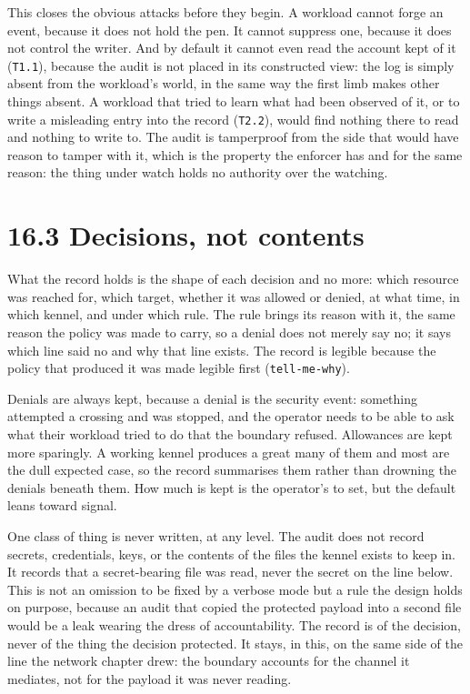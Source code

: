 This closes the obvious attacks before they begin. A workload cannot
forge an event, because it does not hold the pen. It cannot suppress
one, because it does not control the writer. And by default it cannot
even read the account kept of it (\texttt{T1.1}), because the audit is
not placed in its constructed view: the log is simply absent from the
workload's world, in the same way the first limb makes other things
absent. A workload that tried to learn what had been observed of it, or
to write a misleading entry into the record (\texttt{T2.2}), would find
nothing there to read and nothing to write to. The audit is tamperproof
from the side that would have reason to tamper with it, which is the
property the enforcer has and for the same reason: the thing under watch
holds no authority over the watching.

\hypertarget{decisions-not-contents}{%
\section{16.3 Decisions, not contents}\label{decisions-not-contents}}

What the record holds is the shape of each decision and no more: which
resource was reached for, which target, whether it was allowed or
denied, at what time, in which kennel, and under which rule. The rule
brings its reason with it, the same reason the policy was made to carry,
so a denial does not merely say no; it says which line said no and why
that line exists. The record is legible because the policy that produced
it was made legible first (\texttt{tell-me-why}).

Denials are always kept, because a denial is the security event:
something attempted a crossing and was stopped, and the operator needs
to be able to ask what their workload tried to do that the boundary
refused. Allowances are kept more sparingly. A working kennel produces a
great many of them and most are the dull expected case, so the record
summarises them rather than drowning the denials beneath them. How much
is kept is the operator's to set, but the default leans toward signal.

One class of thing is never written, at any level. The audit does not
record secrets, credentials, keys, or the contents of the files the
kennel exists to keep in. It records that a secret-bearing file was
read, never the secret on the line below. This is not an omission to be
fixed by a verbose mode but a rule the design holds on purpose, because
an audit that copied the protected payload into a second file would be a
leak wearing the dress of accountability. The record is of the decision,
never of the thing the decision protected. It stays, in this, on the
same side of the line the network chapter drew: the boundary accounts
for the channel it mediates, not for the payload it was never reading.


